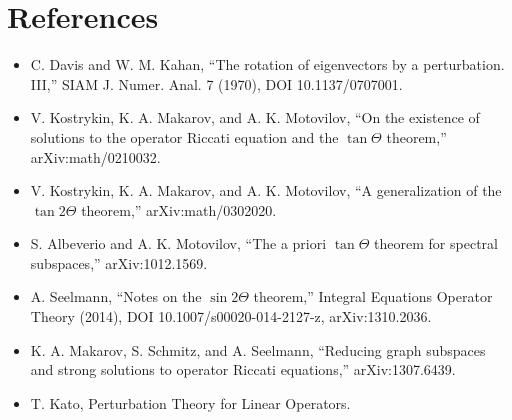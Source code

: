 \documentclass{article}
\begin{document}
\section{References}
\begin{itemize}
\item C. Davis and W. M. Kahan, ``The rotation of eigenvectors by a perturbation. III,'' SIAM J. Numer. Anal. 7 (1970), DOI 10.1137/0707001.
\item V. Kostrykin, K. A. Makarov, and A. K. Motovilov, ``On the existence of solutions to the operator Riccati equation and the $\tan\Theta$ theorem,'' arXiv:math/0210032.
\item V. Kostrykin, K. A. Makarov, and A. K. Motovilov, ``A generalization of the $\tan 2\Theta$ theorem,'' arXiv:math/0302020.
\item S. Albeverio and A. K. Motovilov, ``The a priori $\tan\Theta$ theorem for spectral subspaces,'' arXiv:1012.1569.
\item A. Seelmann, ``Notes on the $\sin 2\Theta$ theorem,'' Integral Equations Operator Theory (2014), DOI 10.1007/s00020-014-2127-z, arXiv:1310.2036.
\item K. A. Makarov, S. Schmitz, and A. Seelmann, ``Reducing graph subspaces and strong solutions to operator Riccati equations,'' arXiv:1307.6439.
\item T. Kato, Perturbation Theory for Linear Operators.
\end{itemize}
\end{document}
